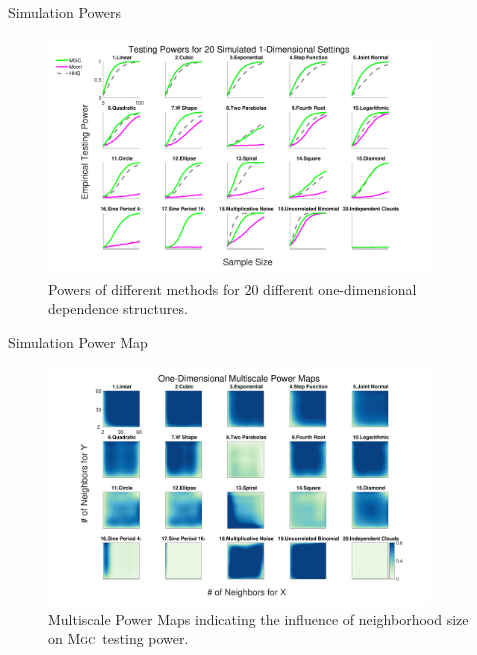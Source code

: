 \documentclass{beamer}
\providecommand{\sct}[1]{{\normalfont\textsc{#1}}}
\newcommand{\Mgc}{\sct{Mgc}}
\begin{document}
\begin{frame}{Simulation Powers}
\begin{figure}[htbp]
\includegraphics[width=0.9\textwidth]{../Figures/Fig1DPower}
\caption{
Powers of different methods for $20$ different one-dimensional dependence structures.}
\end{figure}
\end{frame}

\begin{frame}{Simulation Power Map}
\begin{figure}[htbp]
\includegraphics[width=0.9\textwidth]{../Figures/Fig1DHeat}
\caption{
Multiscale Power Maps indicating the influence of neighborhood size on \Mgc~testing power.}
\end{figure}
\end{frame}
\end{document}
